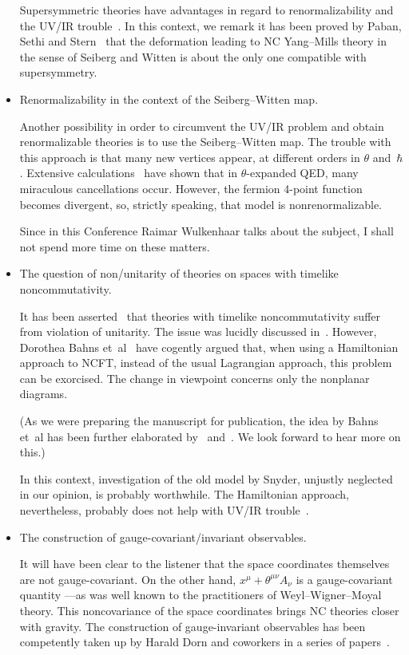 \documentclass[a4paper,12pt]{article}
\newcommand{\1}{\mathbf{1}}         %
\newcommand{\7}{\dagger}            %
\newcommand{\8}{\bullet}            %
\renewcommand{\.}{\cdot}            %
\renewcommand{\:}{\colon}           %
\begin{document}
\begin{itemize}
Supersymmetric theories have advantages in regard to renormalizability
and the UV/IR trouble~\cite{GirottiGRS}. In this context, we remark it
has been proved by Paban, Sethi and Stern~\cite{PabanSS} that the
deformation leading to NC Yang--Mills theory in the sense of Seiberg
and Witten is about the only one compatible with supersymmetry.


\item  Renormalizability in the context of the Seiberg--Witten map.

Another possibility in order to circumvent the UV/IR problem and
obtain renormalizable theories is to use the Seiberg--Witten map. The
trouble with this approach is that many new vertices appear, at
different orders in $\theta$ and~$\hbar$. Extensive
calculations~\cite{WulkenhaarTheta} have shown that in
$\theta$-expanded QED, many miraculous cancellations occur. However,
the fermion 4-point function becomes divergent, so, strictly speaking,
that model is nonrenormalizable.

Since in this Conference Raimar Wulkenhaar talks about the subject, I
shall not spend more time on these matters.


\item  The question of non/unitarity of theories on spaces with
timelike noncommutativity.

It has been asserted~\cite{GomisM} that theories with timelike
noncommutativity suffer from violation of unitarity. The issue was
lucidly discussed in~\cite{LAGBarbonZ}. However, Dorothea Bahns
et~al~\cite{BahnsDFP} have cogently argued that, when using a
Hamiltonian approach to NCFT, instead of the usual Lagrangian
approach, this problem can be exorcised. The change in viewpoint
concerns only the nonplanar diagrams. 

(As we were preparing the manuscript for publication, the idea by
Bahns et~al has been further elaborated by~\cite{RimY}
and~\cite{LiaoS}. We look forward to hear more on this.)

In this context, investigation of the old model by Snyder, unjustly
neglected in our opinion, is probably worthwhile. The Hamiltonian
approach, nevertheless, probably does not help with UV/IR
trouble~\cite{BahnsPrivate}.


\item  The construction of gauge-covariant/invariant observables.

It will have been clear to the listener that the space coordinates 
themselves are not gauge-covariant. On the other hand, 
$x^\mu + \theta^{\mu\nu} A_\nu$ is a gauge-covariant quantity
---as was well known to the
practitioners of Weyl--Wigner--Moyal theory. This noncovariance of the
space coordinates brings NC theories closer with gravity. The
construction of gauge-invariant observables has been competently taken
up by Harald Dorn and coworkers in a series of papers~\cite{Dorn}.



\end{itemize}
\end{document}
